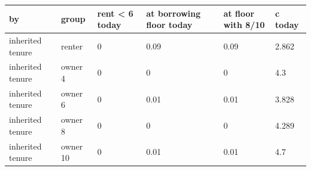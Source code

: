 \begingroup\small
\setlength{\tabcolsep}{3pt}
\renewcommand{\arraystretch}{1.04}
\begin{tabularx}{\linewidth}{XXXXXX}
\toprule
by & group & rent \textless{} 6 today & at borrowing floor today & at floor with 8/10 & c today \\
\midrule
inherited tenure & renter & 0 & 0.09 & 0.09 & 2.862 \\
inherited tenure & owner 4 & 0 & 0 & 0 & 4.3 \\
inherited tenure & owner 6 & 0 & 0.01 & 0.01 & 3.828 \\
inherited tenure & owner 8 & 0 & 0 & 0 & 4.289 \\
inherited tenure & owner 10 & 0 & 0.01 & 0.01 & 4.7 \\
\bottomrule
\end{tabularx}
\endgroup
